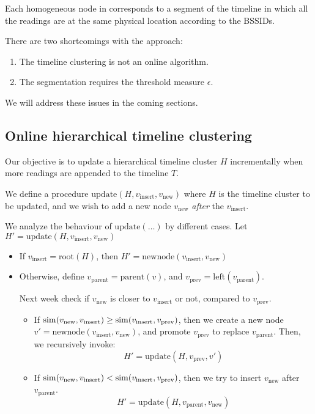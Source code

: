 Each homogeneous node in corresponds to a segment of the timeline in which all
the readings are at the same physical location according to the BSSIDs.

There are two shortcomings with the approach:

\begin{enumerate}
    \item The timeline clustering is not an online algorithm.
    \item The segmentation requires the threshold measure $\epsilon$.
\end{enumerate}

We will address these issues in the coming sections.

\subsection{Online hierarchical timeline clustering}

Our objective is to update a hierarchical timeline cluster $H$ incrementally when
more readings are appended to the timeline $T$.

We define a procedure $\mathrm{update}(H, v_\mathrm{insert}, v_\mathrm{new})$
where $H$ is the timeline cluster to be updated, and we wish to add a new node
$v_\mathrm{new}$ {\em after} the $v_\mathrm{insert}$.

We analyze the behaviour of $\mathrm{update}(\dots)$ by different cases.
Let $H' = \mathrm{update}(H, v_\mathrm{insert}, v_\mathrm{new})$

\begin{itemize}
    \item If $v_\mathrm{insert} = \mathrm{root}(H)$, then
        $H' = \mathrm{newnode}(v_\mathrm{insert}, v_\mathrm{new})$
    \item Otherwise, define $v_\mathrm{parent} = \mathrm{parent}(v)$, and
        $v_\mathrm{prev} = \mathrm{left}(v_\mathrm{parent})$.

        Next week check if $v_\mathrm{new}$ is closer to $v_\mathrm{insert}$ or
        not, compared to $v_\mathrm{prev}$.
        \begin{itemize}
            \item If $\mathrm{sim}(v_\mathrm{new}, v_\mathrm{insert}) \geq 
                      \mathrm{sim}(v_\mathrm{insert}, v_\mathrm{prev})$, then
                    we create a new node $v' = \mathrm{newnode}(v_\mathrm{insert},
                    v_\mathrm{new})$, and promote $v_\mathrm{prev}$ to replace
                    $v_\mathrm{parent}$.  Then, we recursively invoke:
                    $$H' = \mathrm{update}(H, v_\mathrm{prev}, v')$$
            \item If $\mathrm{sim}(v_\mathrm{new}, v_\mathrm{insert})  <
                      \mathrm{sim}(v_\mathrm{insert}, v_\mathrm{prev})$, then
                    we try to insert $v_\mathrm{new}$ after $v_\mathrm{parent}$.
                    $$H' = \mathrm{update}(H, v_\mathrm{parent}, v_\mathrm{new})$$
        \end{itemize}
\end{itemize}

